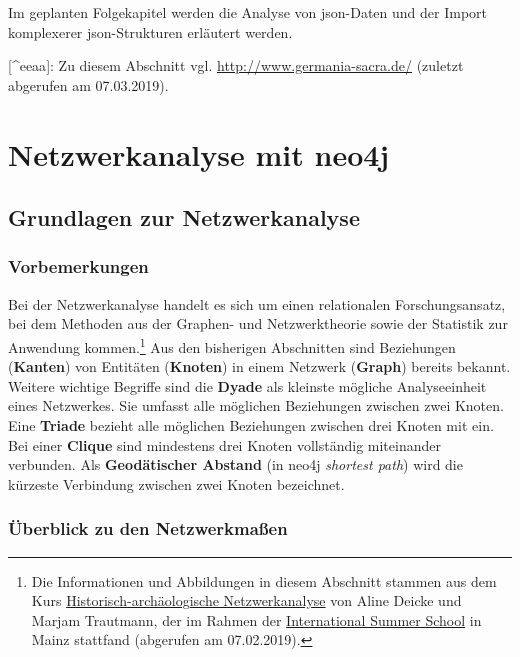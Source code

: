 \documentclass[ngerman,]{scrreprt}
\begin{document}
Im geplanten Folgekapitel werden die Analyse von json-Daten und der Import komplexerer json-Strukturen erläutert werden.

{[}\^{}eeaa{]}: Zu diesem Abschnitt vgl. \url{http://www.germania-sacra.de/} (zuletzt abgerufen am 07.03.2019).

\chapter{Netzwerkanalyse mit neo4j}\label{netzwerkanalyse-mit-neo4j}

\section{Grundlagen zur Netzwerkanalyse}\label{grundlagen-zur-netzwerkanalyse}

\subsection{Vorbemerkungen}\label{vorbemerkungen}

Bei der Netzwerkanalyse handelt es sich um einen relationalen Forschungsansatz, bei dem Methoden aus der Graphen- und Netzwerktheorie sowie der Statistik zur Anwendung kommen.\footnote{Die Informationen und Abbildungen in diesem Abschnitt stammen aus dem Kurs \href{https://digitale-methodik.adwmainz.net/mod5/5c/slides/networkAnalysis/2018/\#/step-1}{Historisch-archäologische Netzwerkanalyse} von Aline Deicke und Marjam Trautmann, der im Rahmen der \href{https://iss.adwmainz.net}{International Summer School} in Mainz stattfand (abgerufen am 07.02.2019).} Aus den bisherigen Abschnitten sind Beziehungen (\textbf{Kanten}) von Entitäten (\textbf{Knoten}) in einem Netzwerk (\textbf{Graph}) bereits bekannt. Weitere wichtige Begriffe sind die \textbf{Dyade} als kleinste mögliche Analyseeinheit eines Netzwerkes. Sie umfasst alle möglichen Beziehungen zwischen zwei Knoten. Eine \textbf{Triade} bezieht alle möglichen Beziehungen zwischen drei Knoten mit ein. Bei einer \textbf{Clique} sind mindestens drei Knoten vollständig miteinander verbunden. Als \textbf{Geodätischer Abstand} (in neo4j \emph{shortest path}) wird die kürzeste Verbindung zwischen zwei Knoten bezeichnet.

\subsection{Überblick zu den Netzwerkmaßen}\label{uxfcberblick-zu-den-netzwerkmauxdfen}
\end{document}
